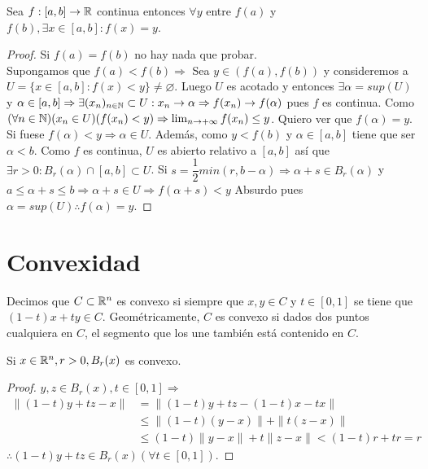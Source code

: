 \begin{theorem}
  Sea \(f: [a, b] \to \mathbb{R}\) continua entonces \(\forall y\) entre \(f(a)\) y \(f(b), \exists x \in [a, b] : f(x) = y\).

  \begin{proof}
    Si \(f(a) = f(b)\) no hay nada que probar. \\
    Supongamos que \(f(a) < f(b) \Rightarrow\) Sea \(y \in (f(a), f(b))\) y consideremos a \(U = \{ x \in [a, b] : f(x) < y \} \neq \varnothing\). Luego \(U\) es acotado y entonces \(\exists \alpha = sup(U)\) y \(\alpha \in [a, b] \Rightarrow \exists (x_n)_{n \in \mathbb{N}} \subset U : x_n \to \alpha \Rightarrow f(x_n) \to f(\alpha)\) pues \(f\) es continua. Como \((\forall n \in \mathbb{N})(x_n \in U)(f(x_n) < y) \Rightarrow \lim_{n \to +\infty} f(x_n) \leq y\). Quiero ver que \(f(\alpha) = y\). Si fuese \(f(\alpha) < y \Rightarrow \alpha \in U\). Además, como \(y < f(b)\) y \(\alpha \in [a, b]\) tiene que ser \(\alpha < b\). Como \(f\) es continua, \(U\) es abierto relativo a \([a, b]\) así que \(\exists r > 0 : B_r(\alpha) \cap [a, b] \subset U\). Si \(s = \dfrac{1}{2} min(r, b-\alpha) \Rightarrow \alpha + s \in B_r(\alpha)\) y \(a \leq \alpha + s \leq b \Rightarrow \alpha + s \in U \Rightarrow f(\alpha + s) < y\) Absurdo pues \(\alpha = sup(U) \therefore f(\alpha) = y\).
  \end{proof}
\end{theorem}

\section{Convexidad}

\begin{definition}[Convexidad]
  Decimos que \(C \subset \mathbb{R}^n\) es convexo si siempre que \(x, y \in C\) y \(t \in [0, 1]\) se tiene que \((1-t)x+ty \in C\). Geométricamente, \(C\) es convexo si dados dos puntos cualquiera en \(C\), el segmento que los une también está contenido en \(C\).
\end{definition}

\begin{eg}
  Si \(x \in \mathbb{R}^n, r > 0, B_r(x)\) es convexo.
  \begin{proof}
    \(y, z \in B_r(x), t \in [0,1] \Rightarrow\) \begin{align*}
      \|(1-t)y+tz - x\| & = \| (1-t)y + tz - (1-t)x - tx \|                \\
                        & \leq \|(1 -t) (y-x) \| + \|t(z-x)\|              \\
                        & \leq (1-t) \|y-x\| + t \|z-x\| < (1-t)r + tr = r
    \end{align*} \(\therefore (1-t)y + tz \in B_r(x) (\forall t \in [0, 1])\).
  \end{proof}
\end{eg}

